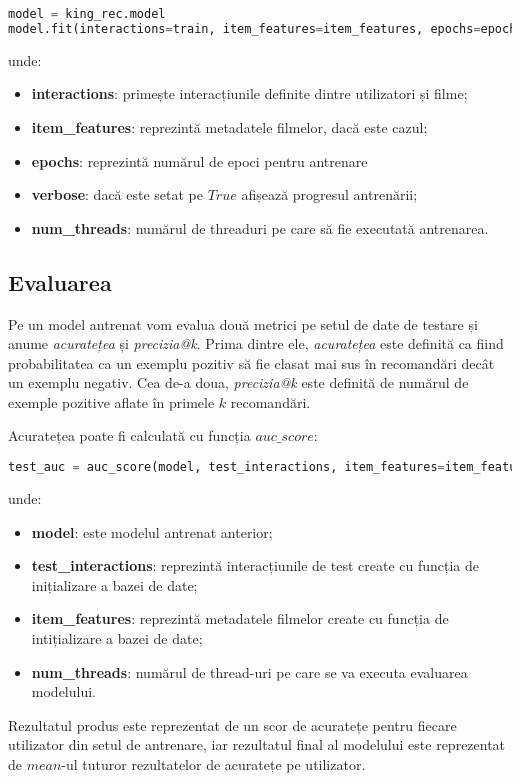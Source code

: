 \begin{lstlisting}[language=Python, caption=\textit{Antrenarea modelului}]
model = king_rec.model
model.fit(interactions=train, item_features=item_features, epochs=epochs, verbose=True, num_threads=threads)
\end{lstlisting}
unde:
\begin{itemize}
	\item \textbf{interactions}: primește interacțiunile definite dintre utilizatori și filme;
	\item \textbf{item\_features}: reprezintă metadatele filmelor, dacă este cazul;
	\item \textbf{epochs}: reprezintă numărul de epoci pentru antrenare
	\item \textbf{verbose}: dacă este setat pe $True$ afișează progresul antrenării;
	\item \textbf{num\_threads}: numărul de threaduri pe care să fie executată antrenarea.
\end{itemize}

\subsection{Evaluarea}
Pe un model antrenat vom evalua două metrici pe setul de date de testare și anume \textit{acuratețea} și \textit{precizia@k}.
Prima dintre ele, \textit{acuratețea} este definită ca fiind probabilitatea ca un exemplu pozitiv să fie clasat mai sus în recomandări decât un exemplu negativ. Cea de-a doua, \textit{precizia@k} este definită de numărul de exemple pozitive aflate în primele $k$ recomandări.

Acuratețea poate fi calculată cu funcția $auc\_score$:
\begin{lstlisting}[language=Python, caption=\textit{Acuratețea unui model}]
test_auc = auc_score(model, test_interactions, item_features=item_features, num_threads=threads).mean()
\end{lstlisting}
unde:
\begin{itemize}
	\item \textbf{model}: este modelul antrenat anterior;
	\item \textbf{test\_interactions}: reprezintă interacțiunile de test create cu funcția de inițializare a bazei de date;
	\item \textbf{item\_features}: reprezintă metadatele filmelor create cu funcția de intițializare a bazei de date;
	\item \textbf{num\_threads}: numărul de thread-uri pe care se va executa evaluarea modelului.
\end{itemize}
Rezultatul produs este reprezentat de un scor de acuratețe pentru fiecare utilizator din setul de antrenare, iar rezultatul final al modelului este reprezentat de $mean$-ul tuturor rezultatelor de acuratețe pe utilizator.

